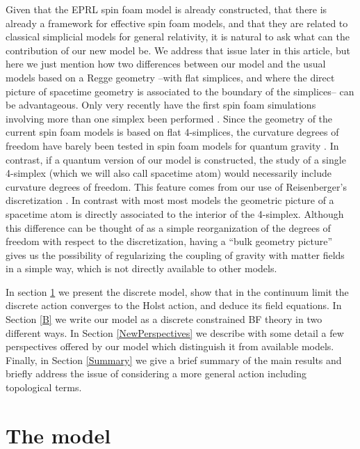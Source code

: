 \documentclass{article}
\begin{document}
Given that the EPRL spin foam model is already constructed, that there is already a framework for effective spin foam models, and that they are related to classical simplicial models for general relativity, it is natural to ask what can the contribution of our new model be. 
We address that issue later in this article, but here we just mention how two differences between our model and the usual models based on a Regge geometry --with flat simplices, and where the direct picture of spacetime geometry is associated to the boundary of the simplices-- can be advantageous. 
Only very recently have the first spin foam simulations involving more than one simplex been performed \cite{ESFM1, SFmoreThan1simplex1, SFmoreThan1simplex2}. Since the geometry of the current spin foam models is based on flat 4-simplices, the curvature degrees of freedom have barely been tested in spin foam models for quantum gravity \cite{Livine}. In contrast, if a quantum version of our model is constructed, the study of a single 4-simplex (which we will also call spacetime atom) would necessarily include curvature degrees of freedom. This feature comes from our use of Reisenberger's discretization \cite{Rei1}. 
In contrast with most most models the geometric picture of a spacetime atom is directly associated to the interior of the 4-simplex. Although this difference can be thought of as a simple reorganization of the degrees of freedom with respect to the discretization, having a ``bulk geometry picture'' gives us the possibility of regularizing the coupling of gravity with matter fields in a simple way, which is not directly available to other models. 



In section \ref{Model} we present the discrete model, show that in the continuum limit the discrete action converges to the Holst action, and deduce its field equations. In Section \ref{B} we write our model as a discrete constrained BF theory in two different ways. 
In Section \ref{NewPerspectives} we describe with some detail a few perspectives offered by our model which distinguish it from available models. 
Finally, in Section \ref{Summary} we give a brief summary of the main results 
and briefly address the issue of considering a more general action including topological terms.




\section{The model}%
\label{Model}
\end{document}
